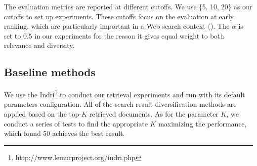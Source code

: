 \documentclass[review]{elsarticle}
\newcommand\revised[1]{{\color{black} #1}}
\begin{document}
\revised{
	The evaluation metrics are reported at different cutoffs. We use \{5, 10, 20\} as our cutoffs to set up experiments. These cutoffs focus on the evaluation at early ranking, which are particularly important in a Web search context (\cite{jansen1998real}). The $\alpha$ is set to 0.5 in our experiments for the reason it gives equal weight to both relevance and diversity.
	}

\subsection{Baseline methods}\label{baseline_setting}

\revised{
We use the Indri\footnote{http://www.lemurproject.org/indri.php} to conduct our retrieval experiments and run with its default parameters configuration. %
All of the search result diversification methods are applied based on the top-$ K $ retrieved documents. As for the parameter $K$, we conduct a series of tests to find the appropriate $K$ maximizing the performance, which found 50 achieves the best result.}
\end{document}
